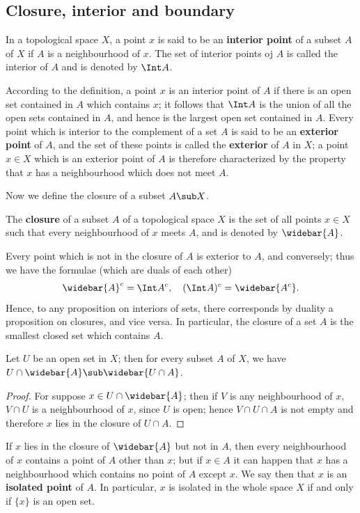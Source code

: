 \subsection{Closure, interior and boundary}
\begin{definition}
In a topological space $X$, a point $x$ is said to be an \textbf{interior point} of a subset $A$ of $X$ if $A$ is a neighbourhood of $x$. The set of interior points oj $A$ is called the interior of $A$ and is denoted by $\Int A$.
\end{definition}
According to the definition, a point $x$ is an interior point of $A$ if there is an open set contained in $A$ which contains $x$; it follows that $\Int A$ is the union of all the open sets contained in $A$, and hence is the largest open set contained in $A$. Every point which is interior to the complement of a set $A$ is said to be an \textbf{exterior point} of $A$, and the set of these points is called the \textbf{exterior} of $A$ in $X$; a point $x\in X$ which is an exterior point of $A$ is therefore characterized by the property that $x$ has a neighbourhood which does not
meet $A$.\par
Now we define the closure of a subset $A\sub X$.
\begin{definition}
The \textbf{closure} of a subset $A$ of a topological space $X$ is the set of all points $x\in X$ such that every neighbourhood of $x$ meets $A$, and is denoted by $\widebar{A}$.
\end{definition}
Every point which is not in the closure of $A$ is exterior to $A$, and conversely; thus we have the formulae (which are duals of each other)
\[\widebar{A}^c=\Int A^c,\quad (\Int A)^c=\widebar{A^c}.\]
Hence, to any proposition on interiors of sets, there corresponds by duality a proposition on closures, and vice versa. In particular, the closure of a set $A$ is the smallest closed set which contains $A$.
\begin{proposition}\label{topo space closure of open intersection}
Let $U$ be an open set in $X$; then for every subset $A$ of $X$, we have $U\cap\widebar{A}\sub\widebar{U\cap A}$.
\end{proposition}
\begin{proof}
For suppose $x\in U\cap\widebar{A}$; then if $V$ is any neighbourhood of $x$, $V\cap U$ is a neighbourhood of $x$, since $U$ is open; hence $V\cap U\cap A$ is not empty and therefore $x$ lies in the closure of $U\cap A$.
\end{proof}
If $x$ lies in the closure of $\widebar{A}$ but not in $A$, then every neighbourhood of $x$ contains a point of $A$ other than $x$; but if $x\in A$ it can happen that $x$ has a neighbourhood which contains no point of $A$ except $x$. We say then that $x$ is an \textbf{isolated point} of $A$. In particular, $x$ is isolated in the whole space $X$ if and only if $\{x\}$ is an open set.
